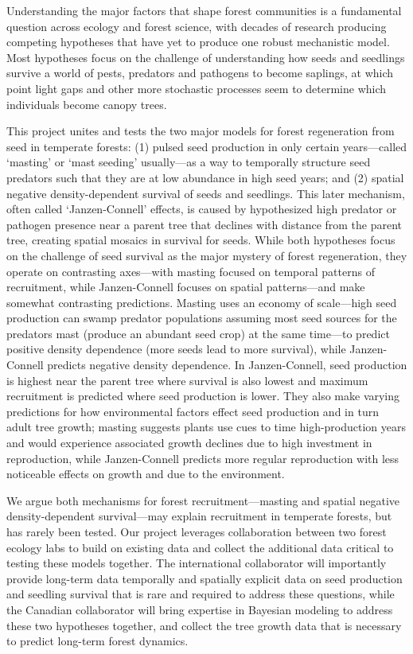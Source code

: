 \documentclass[11pt]{article}
\begin{document}
Understanding the major factors that shape forest communities is a fundamental question across ecology and forest science, with decades of research producing competing hypotheses that have yet to produce one robust mechanistic model. Most hypotheses focus on the challenge of understanding how seeds and seedlings survive a world of pests, predators and pathogens to become saplings, at which point light gaps and other more stochastic processes seem to determine which individuals become canopy trees. 

This project unites and tests the two major models for forest regeneration from seed in temperate forests: (1) pulsed seed production in only certain years---called `masting' or `mast seeding' usually---as a way to temporally structure seed predators such that they are at low abundance in high seed years; and (2) spatial negative density-dependent survival of seeds and seedlings. This later mechanism, often called `Janzen-Connell' effects, is caused by hypothesized high predator or pathogen presence near a parent tree that declines with distance from the parent tree, creating spatial mosaics in survival for seeds. While both hypotheses focus on the challenge of seed survival as the major mystery of forest regeneration, they operate on contrasting axes---with masting focused on temporal patterns of recruitment, while Janzen-Connell focuses on spatial patterns---and make somewhat contrasting predictions. Masting uses an economy of scale---high seed production can swamp predator populations assuming most seed sources for the predators mast (produce an abundant seed crop) at the same time---to predict positive density dependence (more seeds lead to more survival), while Janzen-Connell predicts negative density dependence. In Janzen-Connell, seed production is highest near the parent tree where survival is also lowest and maximum recruitment is predicted where seed production is lower. They also make varying predictions for how environmental factors effect seed production and in turn adult tree growth; masting suggests plants use cues to time high-production years and would experience associated growth declines due to high investment in reproduction, while Janzen-Connell predicts more regular reproduction with less noticeable effects on growth and due to the environment. 

We argue both mechanisms for forest recruitment---masting and spatial negative density-dependent survival---may explain recruitment in temperate forests, but has rarely been tested. Our project leverages collaboration between two forest ecology labs to build on existing data and collect the additional data critical to testing these models together. The international collaborator will importantly provide long-term data temporally and spatially explicit data on seed production and seedling survival that is rare and required to address these questions, while the Canadian collaborator will bring expertise in Bayesian modeling to address these two hypotheses together, and collect the tree growth data that is necessary to predict long-term forest dynamics. 
\end{document}
